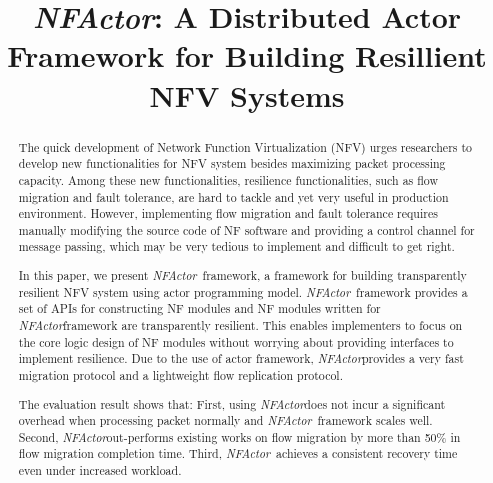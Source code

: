 \documentclass{sig-alternate-10pt}
\def\nfactor{\textit{NFActor}}
\begin{document}
\title{\Large \bf \nfactor: A Distributed Actor Framework for Building Resillient NFV Systems}

\maketitle

\begin{abstract}

The quick development of Network Function Virtualization (NFV) urges researchers to develop new functionalities for NFV system besides maximizing packet processing capacity. Among these new functionalities, resilience functionalities, such as flow migration and fault tolerance, are hard to tackle and yet very useful in production environment. However, implementing flow migration and fault tolerance requires manually modifying the source code of NF software and providing a control channel for message passing, which may be very tedious to implement and difficult to get right.

In this paper, we present \nfactor~framework, a framework for building transparently resilient NFV system using actor programming model. \nfactor~framework provides a set of APIs for constructing NF modules and NF modules written for \nfactor framework are transparently resilient. This enables implementers to focus on the core logic design of NF modules without worrying about providing interfaces to implement resilience. Due to the use of actor framework, \nfactor provides a very fast migration protocol and a lightweight flow replication protocol.

The evaluation result shows that: First, using \nfactor does not incur a significant overhead when processing packet normally and \nfactor~framework scales well. Second, \nfactor out-performs existing works on flow migration by more than 50\% in flow migration completion time. Third, \nfactor~achieves a consistent recovery time even under increased workload.


\end{abstract}




%




%





\end{document}

